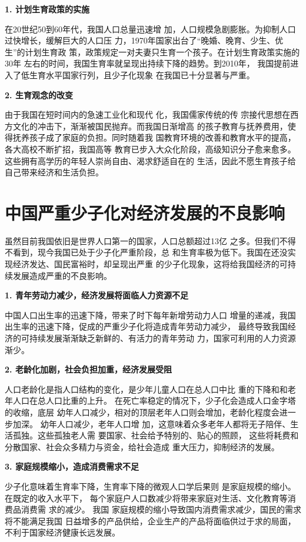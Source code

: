 \documentclass[cs5size,b5paper,nofonts]{ctexart}
\begin{document}
\begin{multicols}{2}
{\bf 1. 计划生育政策的实施}

在20世纪50到60年代，我国人口总量迅速增
加，人口规模急剧膨胀。为抑制人口过快增长，缓解巨大的人口压
力，1970年国家出台了“晚婚、晚育、少生、优生”的计划生育政
策，政策规定一对夫妻只生育一个孩子。在计划生育政策实施的30年
左右的时间，我国生育率就呈现出持续下降的趋势。到2010年，
我国提前进入了低生育水平国家行列，且少子化现象
在我国已十分显著与严重。

{\bf 2. 生育观念的改变}

由于我国在短时间内的急速工业化和现代
化，我国儒家传统的传
宗接代思想在西方文化的冲击下，渐渐被国民抛弃。而我国日渐增高
的孩子教育与抚养费用，使得抚养孩子成了家庭的负担。同时随着我
国教育环境的改善和教育水平的提高，各大高校不断扩招，我国高等
教育已步入大众化阶段，高级知识分子愈来愈多。
这些拥有高学历的年轻人崇尚自由、渴求舒适自在的
生活，因此不愿生育孩子给自己带来经济和生活负担。

\section{中国严重少子化对经济发展的不良影响}

虽然目前我国依旧是世界人口第一的国家，人口总额超过13亿
之多。但我们不得不看到，现今我国已处于少子化严重阶段，总
和生育率极为低下。我国在还没实现经济发达、国民富裕时，却呈现出严重
的少子化现象，这将给我国经济的可持续发展造成严重的不良影响。

{\bf 1. 青年劳动力减少，经济发展将面临人力资源不足}

中国人口出生率的迅速下降，带来了时下每年新增劳动力人口
增量的递减，我国
出生率的迅速下降，促成的严重少子化将造成青年劳动力减少，
最终导致我国经济的可持续发展渐渐缺乏新鲜的、有活力的青年劳动
力，国家可利用的人力资源渐少。

{\bf 2. 老龄化加剧，社会负担加重，经济发展受阻}

人口老龄化是指人口结构的变化，是少年儿童人口在总人口中比
重的下降和和老年人口在总人口比重的上升。
在死亡率稳定的情况下，少子化会造成人口金字塔的收缩，底层
幼年人口减少，相对的顶层老年人口则会增加，老龄化程度会进一
步加深。
幼年人口减少，老年人口增
加，这意味着众多老年人都将无子陪伴、生活孤独。这些孤独老人需
要国家、社会给予特别的、贴心的照顾，
这些将耗费和分散国家、社会众多精力与资金，给社会造成
重大压力，抑制经济的发展。

{\bf 3. 家庭规模缩小，造成消费需求不足}

少子化意味着生育率下降，生育率下降的微观人口学后果则
是家庭规模的缩小。
在既定的收入水平下，
每个家庭户人口数减少将带来家庭对生活、文化教育等消费品消费需
求的减少。
我国
家庭规模的缩小导致国内消费需求减少，国民的需求将不能满足我国
日益增多的产品供给，企业生产的产品将面临供过于求的局面，
不利于国家经济健康长远发展。


\end{multicols}
\end{document}
